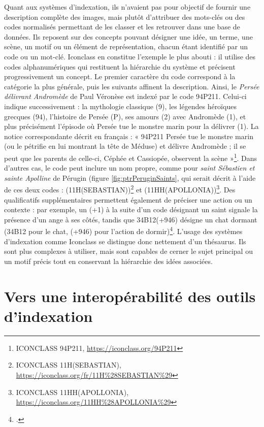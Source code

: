 Quant aux systèmes d’indexation, ils n’avaient pas pour objectif de fournir une description complète des images, mais plutôt d’attribuer des mots-clés ou des codes normalisés permettant de les classer et les retrouver dans une base de données. Ils reposent sur des concepts pouvant désigner une idée, un terme, une scène, un motif ou un élément de représentation, chacun étant identifié par un code ou un mot-clé. Iconclass en constitue l’exemple le plus abouti : il utilise des codes alphanumériques qui restituent la hiérarchie du système et précisent progressivement un concept. Le premier caractère du code correspond à la catégorie la plus générale, puis les suivants affinent la description. Ainsi, le \textit{Persée délivrant Andromède} de Paul Véronèse est indexé par le code 94P211. Celui-ci indique successivement : la mythologie classique (9), les légendes héroïques grecques (94), l’histoire de Persée (P), ses amours (2) avec Andromède (1), et plus précisément l’épisode où Persée tue le monstre marin pour la délivrer (1). La notice correspondante décrit en français : « 94P211 Persée tue le monstre marin (ou le pétrifie en lui montrant la tête de Méduse) et délivre Andromède ; il se peut que les parents de celle-ci, Céphée et Cassiopée, observent la scène »\footnote{ICONCLASS 94P211, \url{https://iconclass.org/94P211}}. Dans d’autres cas, le code peut inclure un nom propre, comme pour \textit{saint Sébastien et sainte Apolline} de Pérugin (figure \ref{fig:ptrPeruginSaints}, qui serait décrit à l'aide de ces deux codes : (11H(SEBASTIAN))\footnote{ICONCLASS 11H(SEBASTIAN),  \url{https://iconclass.org/fr/11H\%28SEBASTIAN\%29}} et (11HH(APOLLONIA))\footnote{ICONCLASS 11HH(APOLLONIA), \url{https://iconclass.org/11HH\%28APOLLONIA\%29}}. Des qualificatifs supplémentaires permettent également de préciser une action ou un contexte : par exemple, un (+1) à la suite d’un code désignant un saint signale la présence d’un ange à ses côtés, tandis que 34B12(+946) désigne un chat dormant (34B12 pour le chat, (+946) pour l’action de dormir)\footcite[p. 59]{vanstratenIconographyIndexingIconclass1994}. L’usage des systèmes d’indexation comme Iconclass se distingue donc nettement d’un thésaurus. Ils sont plus complexes à utiliser, mais sont capables de cerner le sujet principal ou un motif précis tout en conservant la hiérarchie des idées associées.

\section{Vers une interopérabilité des outils d’indexation}

